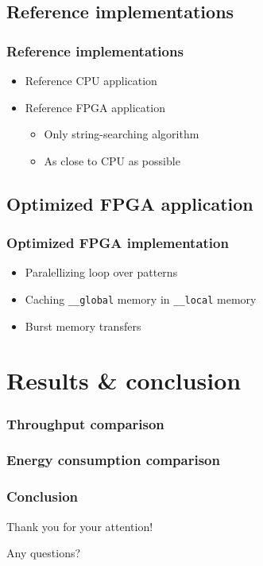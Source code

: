 \documentclass[aspectratio=1610]{uva-inf-presentation}
\begin{document}
\subsection{Reference implementations}

\begin{frame}
  \frametitle{Reference implementations}
  \begin{itemize}
    \item Reference CPU application
    \item Reference FPGA application
      \begin{itemize}
        \item Only string-searching algorithm
        \item As close to CPU as possible
      \end{itemize}
  \end{itemize}
\end{frame}

\subsection{Optimized FPGA application}

\begin{frame}
  \frametitle{Optimized FPGA implementation}
  \begin{itemize}
    \item Paralellizing loop over patterns
    \item Caching \texttt{\_\_global} memory in \texttt{\_\_local} memory
    \item Burst memory transfers
  \end{itemize}
\end{frame}

\section{Results \& conclusion}

\begin{frame}
  \frametitle{Throughput comparison}
\end{frame}

\begin{frame}
  \frametitle{Energy consumption comparison}
\end{frame}

\begin{frame}
  \frametitle{Conclusion}
\end{frame}

\begin{frame}
  \centering
  Thank you for your attention!

  Any questions?
\end{frame}
\end{document}

